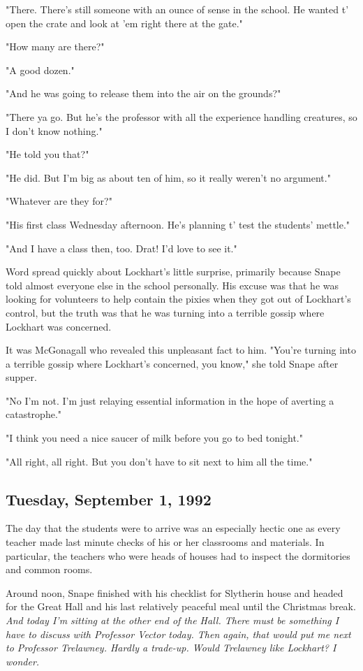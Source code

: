 "There. There's still someone with an ounce of sense in the school. He wanted t' open the crate and look at 'em right there at the gate."

"How many are there?"

"A good dozen."

"And he was going to release them into the air on the grounds?"

"There ya go. But he's the professor with all the experience handling creatures, so I don't know nothing."

"He told you that?"

"He did. But I'm big as about ten of him, so it really weren't no argument."

"Whatever are they for?"

"His first class Wednesday afternoon. He's planning t' test the students' mettle."

"And I have a class then, too. Drat! I'd love to see it."

Word spread quickly about Lockhart's little surprise, primarily because Snape told almost everyone else in the school personally. His excuse was that he was looking for volunteers to help contain the pixies when they got out of Lockhart's control, but the truth was that he was turning into a terrible gossip where Lockhart was concerned.

It was McGonagall who revealed this unpleasant fact to him. "You're turning into a terrible gossip where Lockhart's concerned, you know," she told Snape after supper.

"No I'm not. I'm just relaying essential information in the hope of averting a catastrophe."

"I think you need a nice saucer of milk before you go to bed tonight."

"All right, all right. But you don't have to sit next to him all the time."

\subsection{Tuesday, September 1, 1992}

The day that the students were to arrive was an especially hectic one as every teacher made last minute checks of his or her classrooms and materials. In particular, the teachers who were heads of houses had to inspect the dormitories and common rooms.

Around noon, Snape finished with his checklist for Slytherin house and headed for the Great Hall and his last relatively peaceful meal until the Christmas break. \emph{And today I'm sitting at the other end of the Hall. There must be something I have to discuss with Professor Vector today. Then again, that would put me next to Professor Trelawney. Hardly a trade-up. Would Trelawney like Lockhart? I wonder.}

